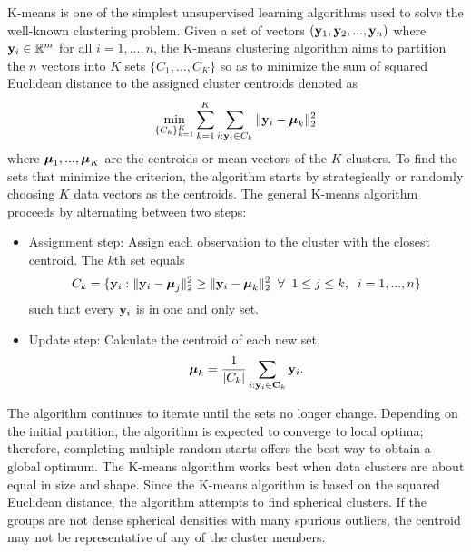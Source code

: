 K-means is one of the simplest unsupervised learning algorithms used to solve the well-known clustering problem. Given a set of vectors $(\mathbf y_{1},\mathbf y_{2},...,\mathbf y_{n})$ where $\mathbf y_{i}\in\mathbb{R}^{m}$ for all $i=1,...,n$, the K-means clustering algorithm aims to partition the $n$ vectors into $K$ sets $\{C_{1},...,C_{K}\}$ so as to minimize the sum of squared Euclidean distance to the assigned cluster centroids denoted as
$$\min_{\{C_{k}\}_{k=1}^{K}}\sum_{k=1}^{K}\sum_{i: \mathbf y_{i}\in C_{k}}\|\mathbf y_{i} -\boldsymbol \mu_{k}\|_{2}^{2}$$
where $\boldsymbol\mu_{1},...,\boldsymbol\mu_{K}$ are the centroids or mean vectors of the $K$ clusters. To find the sets that minimize the criterion, the algorithm starts by strategically or randomly choosing $K$ data vectors as the centroids. The general K-means algorithm proceeds by alternating between two steps:
\begin{itemize}
\item Assignment step: Assign each observation to the cluster with the closest centroid. The $k$th set equals
$$ C_{k} = \{\mathbf y_{i}: \|\mathbf y_{i} - \boldsymbol\mu_{j}\|_{2}^{2}\geq \|\mathbf y_{i} - \boldsymbol\mu_{k}\|_{2}^{2} \;\;\forall\;\; 1\leq j\leq k,\;\; i=1,...,n\}$$
such that every $\mathbf y_{i}$ is in one and only set.
\item Update step: Calculate the centroid of each new  set,
$$\boldsymbol\mu_{k} = \frac{1}{|C_{k}|}\sum_{i: \mathbf y_{i}\in\mathbf C_{k}} \mathbf y_{i}.$$
\end{itemize}
The algorithm continues to iterate until the sets no longer change. Depending on the initial partition, the algorithm is expected to converge to local optima; therefore, completing multiple random starts offers the best way to obtain a global optimum. The K-means algorithm works best when data clusters are about equal in size and shape. Since the K-means algorithm is based on the squared Euclidean distance, the algorithm attempts to find spherical clusters. If the groups are not dense spherical densities with many spurious outliers, the centroid may not be representative of any of the cluster members.

